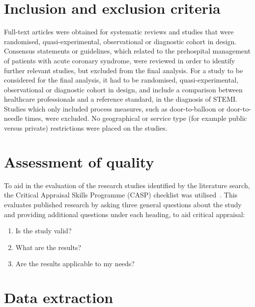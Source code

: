 \section{Inclusion and exclusion criteria}
\label{inclusionandexclusioncriteria}

Full-text articles were obtained for systematic reviews and studies that were randomised, quasi-experimental, observational or diagnostic cohort in design. Consensus statements or guidelines, which related to the prehospital management of patients with acute coronary syndrome, were reviewed in order to identify further relevant studies, but excluded from the final analysis. For a study to be considered for the final analysis, it had to be randomised, quasi-experimental, observational or diagnostic cohort in design, and include a comparison between healthcare professionals and a reference standard, in the diagnosis of STEMI. Studies which only included process measures, such as door-to-balloon or door-to-needle times, were excluded. No geographical or service type (for example public versus private) restrictions were placed on the studies. 

\section{Assessment of quality}
\label{assessmentofquality}

To aid in the evaluation of the research studies identified by the literature search, the Critical Appraisal Skills Programme (CASP) checklist was utilised~\citep{critical_appraisal_skills_programme_appraising_2013}. This evaluates published research by asking three general questions about the study and providing additional questions under each heading, to aid critical appraisal:

\begin{enumerate}
\item Is the study valid?

\item What are the results?

\item Are the results applicable to my needs?

\end{enumerate}

\section{Data extraction}
\label{dataextraction}

